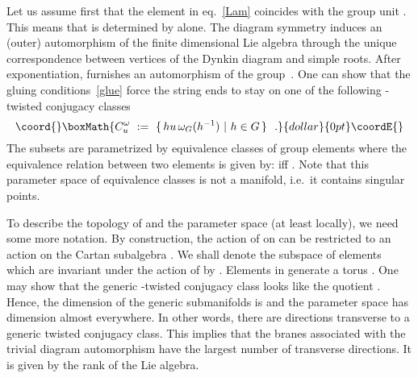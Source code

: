 \documentclass[12pt,a4paper]{article}
\providecommand{\mf}{\mathfrak} %
\def\U{{\mathcal U}}
\def\id{{\rm id}}
\def\st{{\mathcal T}}
\def\C{{\mathcal C}}
\begin{document}
Let us assume first that the element \coordHE{} in eq.~\eqref{Lam}
coincides with the group unit \coordHE{}. This means that \myHighlight{$\Lambda
= \Omega = \Omega_\omega$}\coordHE{} is determined by \myHighlight{$\omega$}\coordHE{} alone. The
diagram symmetry \myHighlight{$\omega$}\coordHE{} induces an (outer) automorphism 
\myHighlight{$\omega$}\coordHE{} of the finite dimensional Lie algebra \myHighlight{$\mf{g}$}\coordHE{} through 
the unique correspondence between vertices of the Dynkin diagram 
and simple roots. After exponentiation, \myHighlight{$\omega$}\coordHE{} furnishes
an automorphism \coordHE{} of the group~\coordHE{}. One can show that 
the gluing conditions~\eqref{glue} force the string ends to 
stay on one of the following \myHighlight{$\omega$}\coordHE{}-twisted conjugacy 
classes
$$\coord{}\boxMath{ C^\omega_u \ := \ \{\,  h u\,  \omega_G(h^{-1})\ |\ h \in G 
\, \} \ \ . }{dollar}{0pt}\coordE{}$$
The subsets \coordHE{} are parametrized 
by equivalence classes of group elements \coordHE{} where the 
equivalence relation between two elements \coordHE{} is
given by: \coordHE{} iff \coordHE{}. Note 
that this parameter space \myHighlight{$\U^\omega$}\coordHE{} of equivalence classes
is not a manifold, i.e.\ it contains singular points.  
\smallskip

To describe the topology of \coordHE{} and the parameter 
space \myHighlight{$\U^\omega$}\coordHE{} (at least locally), we need some more 
notation. By construction, the action of \myHighlight{$\omega$}\coordHE{} on 
\myHighlight{$\mf{g}$}\coordHE{} can be restricted to an action on the Cartan subalgebra \myHighlight{$\st$}\coordHE{}. 
We shall denote the subspace of elements which are invariant 
under the action of \myHighlight{$\omega$}\coordHE{} by \myHighlight{$\st^\omega \subset \st$}\coordHE{}. 
Elements in \myHighlight{$\st^\omega$}\coordHE{} generate a torus \coordHE{}. 
One may show that the generic \myHighlight{$\omega$}\coordHE{}-twisted conjugacy class
\myHighlight{$\C^\omega_u$}\coordHE{} looks like the quotient \coordHE{}. Hence, 
the dimension of the generic submanifolds \myHighlight{$\C^\omega_u$}\coordHE{} 
is \coordHE{} and the parameter space has
dimension \myHighlight{$\dim \st^\omega$}\coordHE{} almost everywhere.
In other words, there are \myHighlight{$\dim \st^\omega$}\coordHE{} 
directions transverse to a generic twisted conjugacy 
class. This implies that the branes associated with the 
trivial diagram automorphism \myHighlight{$\omega = \id$}\coordHE{} have the largest 
number of transverse directions. It is given by the rank of 
the Lie algebra. 
\smallskip 
\end{document}
